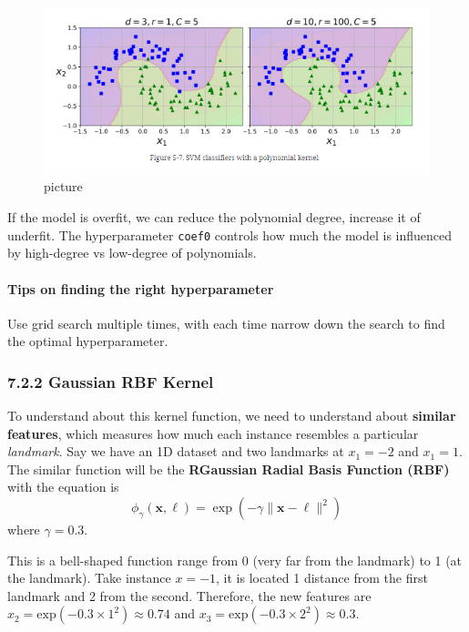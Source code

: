 \documentclass[
  letterpaper,
  DIV=11,
  numbers=noendperiod]{scrartcl}
\let\oldparagraph\paragraph
\renewcommand{\paragraph}[1]{\oldparagraph{#1}\mbox{}}
\begin{document}
\begin{figure}[H]

{\centering \includegraphics{3.png}

}

\caption{picture}

\end{figure}%

If the model is overfit, we can reduce the polynomial degree, increase
it of underfit. The hyperparameter \texttt{coef0} controls how much the
model is influenced by high-degree vs low-degree of polynomials.

\paragraph{Tips on finding the right
hyperparameter}\label{tips-on-finding-the-right-hyperparameter}

Use grid search multiple times, with each time narrow down the search to
find the optimal hyperparameter.

\subsubsection{7.2.2 Gaussian RBF Kernel}\label{gaussian-rbf-kernel}

To understand about this kernel function, we need to understand about
\textbf{similar features}, which measures how much each instance
resembles a particular \emph{landmark}. Say we have an 1D dataset and
two landmarks at \(x_1=-2\) and \(x_1 = 1\). The similar function will
be the \textbf{RGaussian Radial Basis Function (RBF)} with the equation
is \[
\phi_{\gamma}(\mathbf{x}, \ell) = \exp\left(-\gamma \|\mathbf{x} - \ell\|^2\right)
\] where \(\gamma=0.3\).

This is a bell-shaped function range from 0 (very far from the landmark)
to 1 (at the landmark). Take instance \(x=-1\), it is located 1 distance
from the first landmark and 2 from the second. Therefore, the new
features are \(x_2=\text{exp}(-0.3 \times 1^2) \approx 0.74\) and
\(x_3=\text{exp}(-0.3 \times 2^2) \approx 0.3\).
\end{document}
